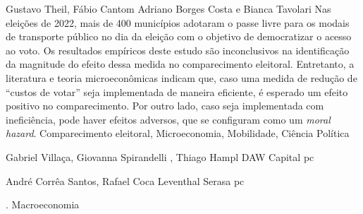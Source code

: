 \documentclass[
    10pt, 
    a4paper, 
    ]{article}
\begin{document}
\tableofcontents

    {Gustavo Theil, Fábio Cantom}
    {Adriano Borges Costa e Bianca Tavolari}
    {
        Nas eleições de 2022, mais de 400 municípios adotaram o passe livre para os modais de transporte público no dia da eleição com o objetivo de democratizar o acesso ao voto. Os resultados empíricos deste estudo são inconclusivos na identificação da magnitude do efeito dessa medida no comparecimento eleitoral. Entretanto, a literatura e teoria microeconômicas indicam que, caso uma medida de redução de ``custos de votar'' seja implementada de maneira eficiente, é esperado um efeito positivo no comparecimento. Por outro lado, caso seja implementada com ineficiência, pode haver efeitos adversos, que se configuram como um \textit{moral hazard}.
    }
    {Comparecimento eleitoral, Microeconomia, Mobilidade, Ciência Política}




    {Gabriel Villaça, Giovanna Spirandelli , Thiago Hampl}
    {DAW Capital}
    {\lipsum[1-1]}
    {pc}



    {André Corrêa Santos, Rafael Coca Leventhal}
    {Serasa}
    {\lipsum[1-1]}
    {pc}



    {.}
    {}
    {\lipsum[1-1]}
    {Macroeconomia}






\clearpage

\nocite{*}

\printbibliography

\appendix
\end{document}

